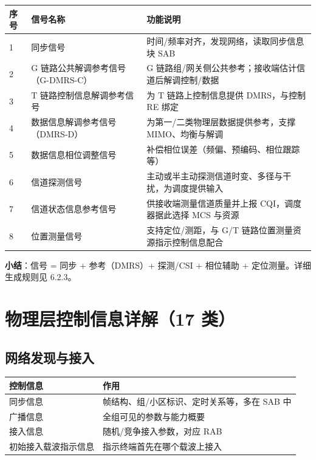 \documentclass[11pt,a4paper]{ctexart}
\begin{document}
\begin{table}[h]
\centering
\small
\begin{tabular}{p{1cm}p{4.5cm}p{8cm}}
\toprule
\textbf{序号} & \textbf{信号名称} & \textbf{功能说明} \\
\midrule
1 & 同步信号 & 时间/频率对齐，发现网络，读取同步信息块 SAB \\
2 & G 链路公共解调参考信号（G-DMRS-C） & G 链路组/网关侧公共参考；接收端估计信道后解调控制/数据 \\
3 & T 链路控制信息解调参考信号 & 为 T 链路上控制信息提供 DMRS，与控制 RE 绑定 \\
4 & 数据信息解调参考信号（DMRS-D） & 为第一/二类物理层数据提供参考，支撑 MIMO、均衡与解调 \\
5 & 数据信息相位调整信号 & 补偿相位误差（频偏、预编码、相位跟踪等） \\
6 & 信道探测信号 & 主动或半主动探测信道时变、多径与干扰，为调度提供输入 \\
7 & 信道状态信息参考信号 & 供接收端测量信道质量并上报 CQI，调度器据此选择 MCS 与资源 \\
8 & 位置测量信号 & 支持定位/测距，与 G/T 链路位置测量资源指示控制信息配合 \\
\bottomrule
\end{tabular}
\end{table}

\textbf{小结}：信号 = 同步 + 参考（DMRS）+ 探测/CSI + 相位辅助 + 定位测量。详细生成规则见 6.2.3。

\section{物理层控制信息详解（17 类）}

\subsection{网络发现与接入}

\begin{table}[h]
\centering
\small
\begin{tabular}{ll}
\toprule
\textbf{控制信息} & \textbf{作用} \\
\midrule
同步信息 & 帧结构、组/小区标识、定时关系等，多在 SAB 中 \\
广播信息 & 全组可见的参数与能力概要 \\
接入信息 & 随机/竞争接入参数，对应 RAB \\
初始接入载波指示信息 & 指示终端首先在哪个载波上接入 \\
\bottomrule
\end{tabular}
\end{table}
\end{document}
